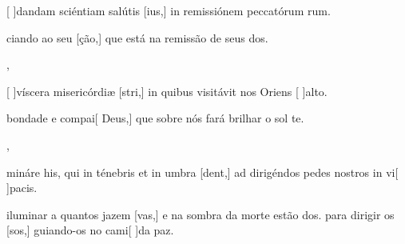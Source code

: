{  {\item {}[ ]{dan}dam sciéntiam salútis [ius,] in remissiónem peccatórum rum.~\Antiphona}%
    {\item {}ciando ao seu [ção,] que está na remissão de seus dos.~\Antiphona},
  {\item {}[ ]{ví}scera misericórdiæ [stri,] in quibus visitávit nos Oriens [ ]{al}to.~\Antiphona}%
    {\item {} bondade e compai[ Deus,] que sobre nós fará brilhar o sol te.~\Antiphona},
  {\item {}mináre his, qui in ténebris et in umbra [dent,] ad dirigéndos pedes nostros in vi[ ]{pa}cis.~\Antiphona}%
    {\item {} iluminar a quantos jazem [vas,] e na sombra da morte estão dos.  para dirigir os [sos,] guiando-os no cami[ ]{da} paz.~\Antiphona}
}